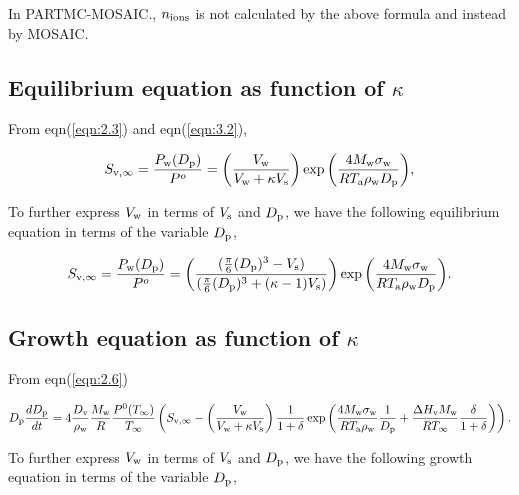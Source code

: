 \documentclass[12pt]{article}
\begin{document}
In PARTMC-MOSAIC., $n_{\rm ions}$ is not calculated by the above formula and instead by MOSAIC.

\subsection{Equilibrium equation as function of $\kappa$}

From eqn(\ref{eqn:2.3}) and eqn(\ref{eqn:3.2}),

\begin{equation}\label{eqn:3.9}
S_{\rm v, \infty}=\frac{P_{\rm w}(D_{\rm p})}{P^{o}}=\left(\frac{V_{\rm w}}{V_{\rm w} + \kappa V_{\rm s}}\right)   \exp{\left(\frac{4 M_{\rm w} \sigma_{\rm w}}{R T_{\rm a} \rho_{\rm w} D_{\rm p}}\right)},
\end{equation}

To further express $V_{\rm w}$ in terms of $V_{\rm s}$ and $ D_{\rm p}$, we have the following equilibrium equation in terms of the variable $D_{\rm p}$, 

\begin{equation}\label{eqn:3.11}
S_{\rm v, \infty}=\frac{P_{\rm w}(D_{\rm p})}{P^{o}}=\left(\frac{(\frac{\pi}{6}(D_{\rm p})^{3}-V_{\rm s}) }{(\frac{\pi}{6}(D_{\rm p})^{3}+(\kappa-1)V_{\rm s})}\right) \exp{\left(\frac{4 M_{\rm w} \sigma_{\rm w}}{R T_{\rm a} \rho_{\rm w} D_{\rm p}}\right)}.
\end{equation}


\subsection{Growth equation as function of $\kappa$ }

From eqn(\ref{eqn:2.6})

\begin{equation}\label{eqn:3.12}
D_{\rm p}\frac{dD_{\rm p}}{dt}=4 \frac{D_{\rm v}} {\rho_{\rm w}} \frac{M_{\rm w}}{R} \frac{P^{\rm 0}(T_{\infty})} {T_{\infty}} \left(S_{\rm v, \infty} -  \left(\frac{V_{\rm w}}{V_{\rm w} + \kappa V_{\rm s}}\right) \frac{1}{1+\delta} \exp \left(\frac{4 M_{\rm w}\sigma_{\rm w}}{R T_{\rm a} \rho_{\rm w}}\frac{1}{D_{\rm p}}+\frac{\Delta H_{\rm v} M_{\rm w}}{R T_{\infty}} \frac{\delta}{1+\delta}\right)\right).
\end{equation}

To further express $V_{\rm w}$ in terms of $V_{\rm s}$ and $ D_{\rm p}$, we have the following growth equation in terms of the variable $D_{\rm p}$,
\end{document}
